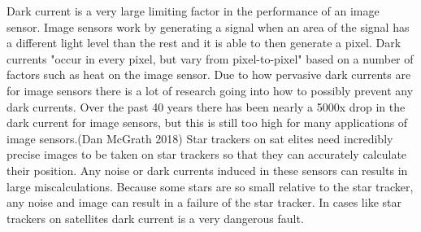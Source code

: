 Dark current is a very large limiting factor in the performance of an image sensor.  Image sensors work by generating a signal when an area of the signal has a different light level than the rest and it is able to then generate a pixel.  Dark currents "occur in every pixel, but vary from pixel-to-pixel" based on a number of factors such as heat on the image sensor.  Due to how pervasive dark currents are for image sensors there is a lot of research going into how to possibly prevent any dark currents.  Over the past 40 years there has  been nearly a 5000x drop in the dark current for image sensors, but this is still too high for many applications of image sensors.(Dan McGrath 2018)  Star trackers on sat elites need incredibly precise images to be taken on star trackers so that they can accurately calculate their position.  Any noise or dark currents induced in these sensors can results in large miscalculations.  Because some stars are so small relative to the star tracker, any noise and image can result in a failure of the star tracker.  In cases like star trackers on satellites dark current is a very dangerous fault.  